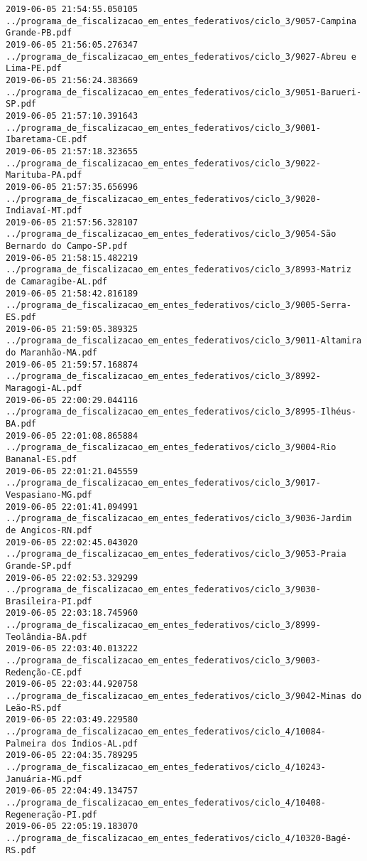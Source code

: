 \begin{lstlisting}
2019-06-05 21:54:55.050105 ../programa_de_fiscalizacao_em_entes_federativos/ciclo_3/9057-Campina Grande-PB.pdf
2019-06-05 21:56:05.276347 ../programa_de_fiscalizacao_em_entes_federativos/ciclo_3/9027-Abreu e Lima-PE.pdf
2019-06-05 21:56:24.383669 ../programa_de_fiscalizacao_em_entes_federativos/ciclo_3/9051-Barueri-SP.pdf
2019-06-05 21:57:10.391643 ../programa_de_fiscalizacao_em_entes_federativos/ciclo_3/9001-Ibaretama-CE.pdf
2019-06-05 21:57:18.323655 ../programa_de_fiscalizacao_em_entes_federativos/ciclo_3/9022-Marituba-PA.pdf
2019-06-05 21:57:35.656996 ../programa_de_fiscalizacao_em_entes_federativos/ciclo_3/9020-Indiavaí-MT.pdf
2019-06-05 21:57:56.328107 ../programa_de_fiscalizacao_em_entes_federativos/ciclo_3/9054-São Bernardo do Campo-SP.pdf
2019-06-05 21:58:15.482219 ../programa_de_fiscalizacao_em_entes_federativos/ciclo_3/8993-Matriz de Camaragibe-AL.pdf
2019-06-05 21:58:42.816189 ../programa_de_fiscalizacao_em_entes_federativos/ciclo_3/9005-Serra-ES.pdf
2019-06-05 21:59:05.389325 ../programa_de_fiscalizacao_em_entes_federativos/ciclo_3/9011-Altamira do Maranhão-MA.pdf
2019-06-05 21:59:57.168874 ../programa_de_fiscalizacao_em_entes_federativos/ciclo_3/8992-Maragogi-AL.pdf
2019-06-05 22:00:29.044116 ../programa_de_fiscalizacao_em_entes_federativos/ciclo_3/8995-Ilhéus-BA.pdf
2019-06-05 22:01:08.865884 ../programa_de_fiscalizacao_em_entes_federativos/ciclo_3/9004-Rio Bananal-ES.pdf
2019-06-05 22:01:21.045559 ../programa_de_fiscalizacao_em_entes_federativos/ciclo_3/9017-Vespasiano-MG.pdf
2019-06-05 22:01:41.094991 ../programa_de_fiscalizacao_em_entes_federativos/ciclo_3/9036-Jardim de Angicos-RN.pdf
2019-06-05 22:02:45.043020 ../programa_de_fiscalizacao_em_entes_federativos/ciclo_3/9053-Praia Grande-SP.pdf
2019-06-05 22:02:53.329299 ../programa_de_fiscalizacao_em_entes_federativos/ciclo_3/9030-Brasileira-PI.pdf
2019-06-05 22:03:18.745960 ../programa_de_fiscalizacao_em_entes_federativos/ciclo_3/8999-Teolândia-BA.pdf
2019-06-05 22:03:40.013222 ../programa_de_fiscalizacao_em_entes_federativos/ciclo_3/9003-Redenção-CE.pdf
2019-06-05 22:03:44.920758 ../programa_de_fiscalizacao_em_entes_federativos/ciclo_3/9042-Minas do Leão-RS.pdf
2019-06-05 22:03:49.229580 ../programa_de_fiscalizacao_em_entes_federativos/ciclo_4/10084-Palmeira dos Índios-AL.pdf
2019-06-05 22:04:35.789295 ../programa_de_fiscalizacao_em_entes_federativos/ciclo_4/10243-Januária-MG.pdf
2019-06-05 22:04:49.134757 ../programa_de_fiscalizacao_em_entes_federativos/ciclo_4/10408-Regeneração-PI.pdf
2019-06-05 22:05:19.183070 ../programa_de_fiscalizacao_em_entes_federativos/ciclo_4/10320-Bagé-RS.pdf

\end{lstlisting}
